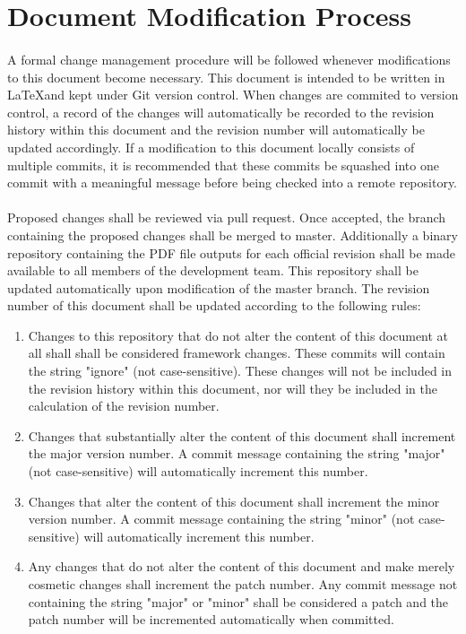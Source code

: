 \section{Document Modification Process}
\paragraph*{}
    A formal change management procedure will be followed whenever modifications
    to this document become necessary. This document is intended to be written in
    \LaTeX and kept under
    Git version control. When changes are commited to version control, a record
    of the changes will automatically be recorded to the revision history within this document and the
    revision number will automatically be updated accordingly. If a modification to this document
    locally consists of multiple commits, it is recommended that these commits be
    squashed into one commit with a meaningful message before being checked into a
    remote repository.

\paragraph*{}
    Proposed changes shall be reviewed via pull request. Once
    accepted, the branch containing the proposed changes shall be merged to master. 
    Additionally a binary repository containing the PDF file outputs for each official revision
    shall be made available to all members of the development team. This repository
    shall be updated automatically upon modification of the master branch. The revision
    number of this document shall be updated according to the following rules:

    \begin{enumerate}
       \item Changes to this repository that do not alter the content of this
                document at all shall shall be considered framework changes. These
                commits will contain the string "ignore" (not case-sensitive). These
                changes will not be included in the revision history within this
                document, nor will they be included in the calculation of the
                revision number.
       \item Changes that substantially alter the content of this document shall
                increment the major version number. A commit message containing the
                string "major" (not case-sensitive) will automatically increment this
                number.
        \item Changes that alter the content of this document shall increment the
                minor version number. A commit message containing the string "minor"
                (not case-sensitive) will automatically increment this number.
        \item Any changes that do not alter the content of this document and make
                merely cosmetic changes shall increment the patch number.
                Any commit message not containing the string "major" or "minor" shall be
                considered a patch and the patch number will be
                incremented automatically when committed.
    \end{enumerate}
